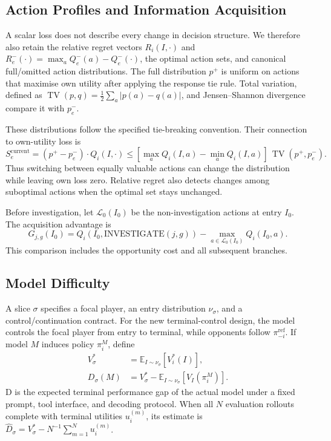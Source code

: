 \documentclass[11pt,a4paper]{article}
\newcommand{\E}{\mathbb{E}}
\begin{document}
\subsection{Action Profiles and Information Acquisition}
A scalar loss does not describe every change in decision structure.
We therefore also retain the relative regret vectors
$R_i(I,\cdot)$ and $R_e^-(\cdot)=\max_a Q_e^-(a)-Q_e^-(\cdot)$,
the optimal action sets, and canonical full/omitted action distributions.
The full distribution $p^+$ is uniform on actions that maximise own
utility after applying the response tie rule. Total variation, defined as
$\operatorname{TV}(p,q)=\tfrac12\sum_a|p(a)-q(a)|$, and Jensen--Shannon
divergence compare it with $p_e^-$.

These distributions follow the specified tie-breaking convention. Their
connection to own-utility loss is
\begin{equation}
 S_e^{\mathrm{current}}=(p^+-p_e^-)\cdot Q_i(I,\cdot)
 \leq[\max_a Q_i(I,a)-\min_a Q_i(I,a)]\,
       \operatorname{TV}(p^+,p_e^-).
 \label{eq:tv-bound}
\end{equation}
Thus switching between equally valuable actions can change the
distribution while leaving own loss zero. Relative regret also detects
changes among suboptimal actions when the optimal set stays unchanged.

Before investigation, let $\mathcal L_0(I_0)$ be the non-investigation
actions at entry $I_0$. The acquisition advantage is
\begin{equation}
 G_{j,g}(I_0)=Q_i(I_0,\mathrm{INVESTIGATE}(j,g))
             -\max_{a\in\mathcal L_0(I_0)}Q_i(I_0,a).
\end{equation}
This comparison includes the opportunity cost and all subsequent branches.

\subsection{Model Difficulty}
A slice $\sigma$ specifies a focal player, an entry distribution $\nu_\sigma$,
and a control/continuation contract. For the new terminal-control design,
the model controls the focal player from entry to terminal, while opponents
follow $\pi_{-i}^{\mathrm{ref}}$. If model $M$ induces policy $\pi_i^M$, define
\begin{align}
 V_\sigma^*&=\E_{I\sim\nu_\sigma}[V_i^*(I)],\\
 D_\sigma(M)&=V_\sigma^*
              -\E_{I\sim\nu_\sigma}[V_I(\pi_i^M)].
 \label{eq:d}
\end{align}
D is the expected terminal performance gap of the actual model under a
fixed prompt, tool interface, and decoding protocol. When all $N$ evaluation
rollouts complete with terminal utilities $u_i^{(m)}$, its estimate is
$\widehat D_\sigma=V_\sigma^*-N^{-1}\sum_{m=1}^N u_i^{(m)}$.
\end{document}
